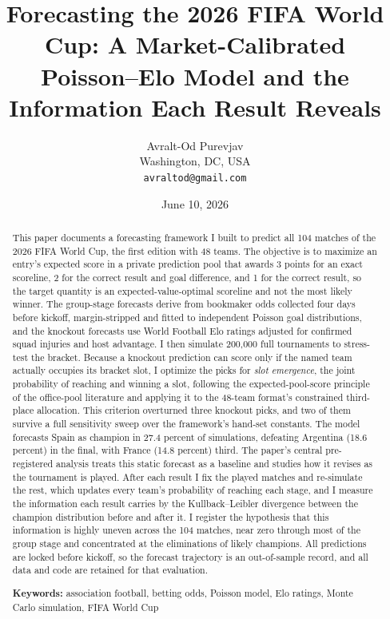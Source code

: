 \documentclass[11pt,a4paper]{article}
\title{\textbf{Forecasting the 2026 FIFA World Cup: A Market-Calibrated Poisson--Elo Model and the Information Each Result Reveals}}
\author{Avralt-Od Purevjav\\ \small Washington, DC, USA \\ \small \texttt{avraltod@gmail.com}}
\date{June 10, 2026}
\begin{document}
\maketitle

\begin{abstract}
\noindent This paper documents a forecasting framework I built to predict all 104 matches of the 2026 FIFA World Cup, the first edition with 48 teams. The objective is to maximize an entry's expected score in a private prediction pool that awards 3 points for an exact scoreline, 2 for the correct result and goal difference, and 1 for the correct result, so the target quantity is an expected-value-optimal scoreline and not the most likely winner. The group-stage forecasts derive from bookmaker odds collected four days before kickoff, margin-stripped and fitted to independent Poisson goal distributions, and the knockout forecasts use World Football Elo ratings adjusted for confirmed squad injuries and host advantage. I then simulate 200{,}000 full tournaments to stress-test the bracket. Because a knockout prediction can score only if the named team actually occupies its bracket slot, I optimize the picks for \emph{slot emergence}, the joint probability of reaching and winning a slot, following the expected-pool-score principle of the office-pool literature and applying it to the 48-team format's constrained third-place allocation. This criterion overturned three knockout picks, and two of them survive a full sensitivity sweep over the framework's hand-set constants. The model forecasts Spain as champion in 27.4 percent of simulations, defeating Argentina (18.6 percent) in the final, with France (14.8 percent) third. The paper's central pre-registered analysis treats this static forecast as a baseline and studies how it revises as the tournament is played. After each result I fix the played matches and re-simulate the rest, which updates every team's probability of reaching each stage, and I measure the information each result carries by the Kullback--Leibler divergence between the champion distribution before and after it. I register the hypothesis that this information is highly uneven across the 104 matches, near zero through most of the group stage and concentrated at the eliminations of likely champions. All predictions are locked before kickoff, so the forecast trajectory is an out-of-sample record, and all data and code are retained for that evaluation.

\medskip
\noindent\textbf{Keywords:} association football, betting odds, Poisson model, Elo ratings, Monte Carlo simulation, FIFA World Cup
\end{abstract}
\end{document}
